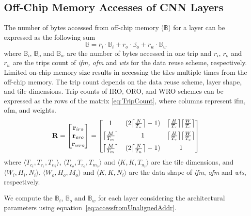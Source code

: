 \documentclass[a4paper,10pt]{article}
\DeclarePairedDelimiter{\ceil}{\lceil}{\rceil}
\newcommand{\numBytesOffChip}{\mathbb{B}}
\begin{document}
\subsection{Off-Chip Memory Accesses of CNN Layers}
The number of bytes accessed from off-chip memory ($\numBytesOffChip$) for a layer can be expressed as the following sum
\begin{equation}\label{eq:TotalOffChipAccess}
	\numBytesOffChip{}={}{r_{i}}{\cdot}\numBytesOffChip_{i}{+}{r_{o}}{\cdot}\numBytesOffChip_{o}{+}{r_{w}}{\cdot}\numBytesOffChip_{w}
\end{equation}
where $\numBytesOffChip_{i}$, $\numBytesOffChip_{o}$ and $\numBytesOffChip_{w}$ are the number of bytes accessed in one trip and $r_{i}$, $r_{o}$ and $r_{w}$ are the trips count of \textit{ifm, ofm} and \textit{wts} for the data reuse scheme, respectively.  Limited on-chip memory size results in accessing the tiles multiple times from the off-chip memory.  The trip count depends on the data reuse scheme, layer shape, and tile dimensions. Trip counts of IRO, ORO, and WRO schemes can be expressed as the rows of the matrix \eqref{eq:TripCount}, where columns represent ifm, ofm, and weights.
\begin{align}\label{eq:TripCount}
	\mathbf{R}=
	\begin{bmatrix}
		\mathbf{r}_{iro} \\  \mathbf{r}_{oro} \\ \mathbf{r}_{wro} \\
	\end{bmatrix}= 
	\begin{bmatrix}
		1  & (2\ceil[\big]{\frac{N}{T_n}}-1) & \ceil[\big]{\frac{H}{T_r}} \ceil[\big]{\frac{W}{T_c}}\\[6pt]
		\ceil[\big]{\frac{M}{T_m}} & 1 & \ceil[\big]{\frac{H}{T_r}} \ceil[\big]{\frac{W}{T_c}}\\[6pt]
		\ceil[\big]{\frac{M}{T_m}} & (2\ceil[\big]{\frac{N}{T_n}}-1) & 1\\
	\end{bmatrix}
\end{align}
where $\langle T_{c_i},T_{r_i},T_{n_i}\rangle$, $\langle T_{c_o},T_{r_o},T_{m_o}\rangle$ and $\langle K,K,T_{n_i}\rangle$ are the tile dimensions, and $\langle W_i,H_i,N_i\rangle$, $\langle W_o,H_o,M_o\rangle$ and $\langle K,K,N_i\rangle$ are the data shape of \textit{ifm}, \textit{ofm} and \textit{wts}, respectively. 

We compute the $\numBytesOffChip_{i}$, $\numBytesOffChip_{o}$ and $\numBytesOffChip_{w}$ for each layer considering the architectural parameters using equation~\ref{eq:accessfromUnalignedAddr}.
\end{document}
